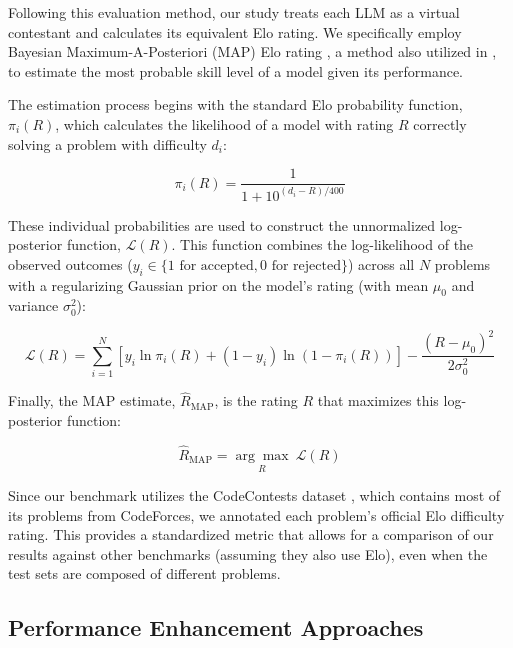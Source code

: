 \documentclass[preprint,12pt]{elsarticle}
\begin{document}
Following this evaluation method, our study treats each LLM as a virtual contestant and calculates its equivalent Elo rating. We specifically employ Bayesian Maximum-A-Posteriori (MAP) Elo rating \cite{zhou2024evaluatingsmoothcontrolattribute}, a method also utilized in \cite{zheng2025livecodebenchproolympiadmedalists}, to estimate the most probable skill level of a model given its performance.

The estimation process begins with the standard Elo probability function, $\pi_i(R)$, which calculates the likelihood of a model with rating $R$ correctly solving a problem with difficulty $d_i$:

\begin{equation*}
\pi_i(R) = \frac{1}{1 + 10^{(d_i - R)/400}}
\end{equation*}

These individual probabilities are used to construct the unnormalized log-posterior function, $\mathcal{L}(R)$. This function combines the log-likelihood of the observed outcomes ($y_i \in \{1 \text{ for accepted}, 0 \text{ for rejected}\}$) across all $N$ problems with a regularizing Gaussian prior on the model's rating (with mean $\mu_0$ and variance $\sigma_0^2$):

\begin{equation*}
\mathcal{L}(R) = \sum_{i=1}^{N} \left[ y_i \ln \pi_i(R) + (1-y_i) \ln(1 - \pi_i(R)) \right] - \frac{(R-\mu_0)^2}{2\sigma_0^2}
\end{equation*}

Finally, the MAP estimate, $\hat{R}_{\text{MAP}}$, is the rating $R$ that maximizes this log-posterior function:

\begin{equation*}
\hat{R}_{\text{MAP}} = \underset{R}{\arg\max} \ \mathcal{L}(R)
\end{equation*}

Since our benchmark utilizes the CodeContests dataset \cite{li2022competition}, which contains most of its problems from CodeForces, we annotated each problem's official Elo difficulty rating. This provides a standardized metric that allows for a comparison of our results against other benchmarks (assuming they also use Elo), even when the test sets are composed of different problems.

\subsection{Performance Enhancement Approaches}
\end{document}
